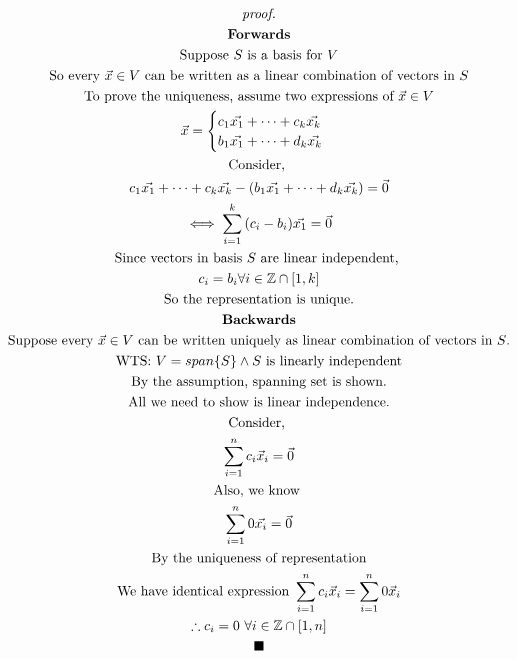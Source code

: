 \documentclass[11pt]{article}
\begin{document}
	\begin{multline*}
		\emph{proof.}
		\\
		\textbf{Forwards} \\
		\text{Suppose $S$ is a basis for $V$}\\
		\text{So every $\vec{x} \in V$ can be written as a linear combination of vectors in $S$}\\
		\text{To prove the uniqueness, assume two expressions of $\vec{x} \in V$}\\
		\vec{x} = \begin{cases}
			c_1\vec{x_1} + \dots + c_k\vec{x_k} \\
			b_1\vec{x_1} + \dots + d_k\vec{x_k} \\
		\end{cases} \\
		\text{Consider, } \\
		c_1\vec{x_1} + \dots + c_k\vec{x_k} - (b_1\vec{x_1} + \dots + d_k\vec{x_k}) = \vec{0} \\
		\iff \sum_{i=1}^k{(c_i - b_i)\vec{x_1}} = \vec{0} \\
		\text{Since vectors in basis $S$ are linear independent, }\\
		c_i = b_i \forall i \in \mathbb{Z} \cap [1,k] \\
		\text{So the representation is unique.}\\
		\textbf{Backwards} \\
		\text{Suppose every $\vec{x} \in V$ can be written uniquely as linear combination of vectors in $S$.} \\
		\text{WTS: } V = span\{S\} \land S \text{ is linearly independent} \\
		\text{By the assumption, spanning set is shown.} \\
		\text{All we need to show is linear independence.} \\
		\text{Consider, } \\
		\sum_{i=1}^n{c_i\vec{x}_i} = \vec{0} \\
		\text{Also, we know }\\
		\sum_{i=1}^n{0 \vec{x_i}} = \vec{0} \\
		\text{By the uniqueness of representation} \\
		\text{We have identical expression } \sum_{i=1}^n{c_i\vec{x}_i} = \sum_{i=1}^n{0\vec{x}_i} \\
		\therefore c_i = 0\ \forall i \in \mathbb{Z} \cap [1,n] \\
		\blacksquare
	\end{multline*}
\end{document}
